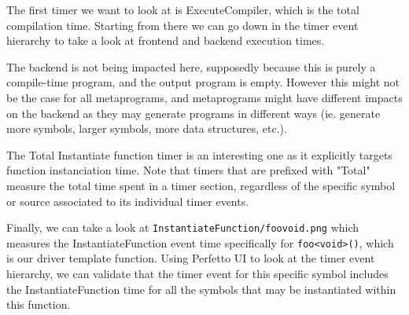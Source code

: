 \documentclass[../../main.tex]{subfiles}
\begin{document}

The first timer we want to look at is ExecuteCompiler, which is the total
compilation time. Starting from there we can go down in the timer event
hierarchy to take a look at frontend and backend execution times.



The backend is not being impacted here, supposedly because this is purely a
compile-time program, and the output program is empty. However this might not be
the case for all metaprograms, and metaprograms might have different impacts on
the backend as they may generate programs in different ways (ie. generate more
symbols, larger symbols, more data structures, etc.).


The Total Instantiate function timer is an interesting one as it explicitly
targets function instanciation time. Note that timers that are prefixed with
"Total" measure the total time spent in a timer section, regardless of the
specific symbol or source associated to its individual timer events.


Finally, we can take a look at \lstinline{InstantiateFunction/foovoid.png} which measures
the InstantiateFunction event time specifically for \lstinline{foo<void>()}, which is our
driver template function. Using Perfetto UI to look at the timer event
hierarchy, we can validate that the timer event for this specific symbol
includes the InstantiateFunction time for all the symbols that may be
instantiated within this function.
\end{document}
